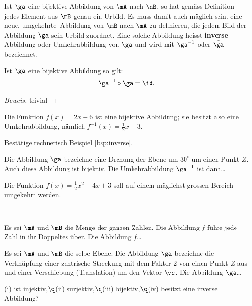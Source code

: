 \documentclass[%
11pt,%
twoside,%
titlepage,%
german,%
headsepline%
]{scrartcl}
\begin{document}
Ist $\ga$ eine bijektive Abbildung von $\mA$ nach $\mB$, so hat gemäss Definition jedes Element aus $\mB$ genau ein Urbild. Es muss damit auch mäglich sein, eine neue, \glqq umgekehrte\grqq\ Abbildung von $\mB$ nach $\mA$ zu definieren, die jedem Bild der Abbildung $\ga$ sein Urbild zuordnet. Eine solche Abbildung heisst \textbf{inverse} Abbildung oder Umkehrabbildung von $\ga$ und wird mit $\ga^{-1}$ oder $\bar{\ga}$ bezeichnet.

\begin{satz}
Ist $\ga$ eine bijektive Abbildung so gilt:
$$\ga^{-1}\circ\ga=\id.$$
\end{satz}

\begin{proof}[Beweis]
trivial
\end{proof}

\begin{bsp}
\label{bsp:inverse}
Die Funktion $f(x) = 2x + 6$ ist eine bijektive Abbildung; sie besitzt also eine
Umkehrabbildung, nämlich $f^{-1}(x)=\frac{1}{2}x-3$.
\end{bsp}

\begin{ueb}
Bestätige rechnerisch Beispiel \ref{bsp:inverse}.
\end{ueb}

\begin{ueb}
Die Abbildung $\ga$ bezeichne eine Drehung der Ebene um $30^\circ$ um einen Punkt $Z$. Auch diese Abbildung ist bijektiv. Die Umkehrabbildung $\ga^{-1}$ ist dann\dots
\end{ueb}

\begin{ueb}
Die Funktion $f(x) = \frac{1}{2}x^2-4x+3$ soll auf einem mäglichst grossen Bereich umgekehrt werden.
\end{ueb}

\begin{ueb}\label{uebinjsurbij}
\ \\[-4ex]
\begin{enumeratea}
\item Es sei $\mA$ und $\mB$ die Menge der ganzen Zahlen. Die Abbildung $f$ führe jede Zahl in ihr Doppeltes über. Die Abbildung $f$\dots
\item Es sei $\mA$ und $\mB$ die selbe Ebene. Die Abbildung $\ga$ bezeichne die Verknüpfung einer zentrische Streckung mit dem Faktor $2$ von einen Punkt $Z$ aus und einer Verschiebung (Translation) um den Vektor $\vc$. Die Abbildung $\ga$\dots

(i) ist injektiv,$\q$(ii) surjektiv,$\q$(iii) bijektiv,$\q$(iv) besitzt eine inverse Abbildung?
\end{enumeratea}
\end{ueb}
\end{document}
